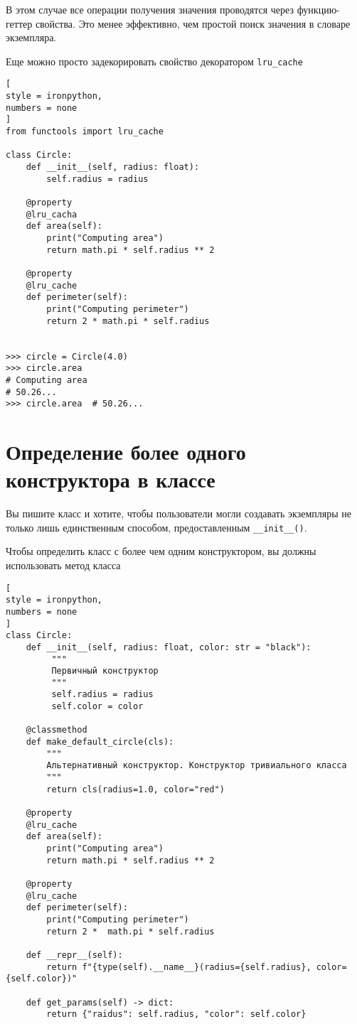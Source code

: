 \documentclass[%
	11pt,
	a4paper,
	utf8,
		]{article}
\begin{document}
В этом случае все операции получения значения проводятся через функцию-геттер свойства. Это менее эффективно, чем простой поиск значения в словаре экземпляра.

Еще можно просто задекорировать свойство декоратором \texttt{lru\_cache}
\begin{lstlisting}[
style = ironpython,
numbers = none
]
from functools import lru_cache

class Circle:
    def __init__(self, radius: float):
        self.radius = radius
        
    @property
    @lru_cacha
    def area(self):
        print("Computing area")
        return math.pi * self.radius ** 2
        
    @property
    @lru_cache
    def perimeter(self):
        print("Computing perimeter")
        return 2 * math.pi * self.radius
        
        
>>> circle = Circle(4.0)
>>> circle.area
# Computing area
# 50.26...
>>> circle.area  # 50.26...
\end{lstlisting}


\section{Определение более одного конструктора в классе}

Вы пишите класс и хотите, чтобы пользователи могли создавать экземпляры не только лишь единственным способом, предоставленным \verb|__init__()|.

Чтобы определить класс с более чем одним конструктором, вы должны использовать метод класса
\begin{lstlisting}[
style = ironpython,
numbers = none
]
class Circle:
    def __init__(self, radius: float, color: str = "black"):
         """
         Первичный конструктор
         """
         self.radius = radius
         self.color = color
    
    @classmethod
    def make_default_circle(cls):
        """
        Альтернативный конструктор. Конструктор тривиального класса
        """
        return cls(radius=1.0, color="red")
    
    @property
    @lru_cache
    def area(self):
        print("Computing area")
        return math.pi * self.radius ** 2
    
    @property
    @lru_cache
    def perimeter(self):
        print("Computing perimeter")
        return 2 *  math.pi * self.radius
    
    def __repr__(self):
        return f"{type(self).__name__}(radius={self.radius}, color={self.color})"
    
    def get_params(self) -> dict:
        return {"raidus": self.radius, "color": self.color}
\end{lstlisting}
\end{document}

